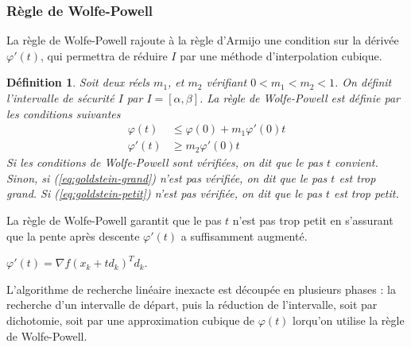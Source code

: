 \documentclass[3p, twocolumn]{elsarticle}
\newtheorem{definition}{Définition}[section]
\begin{document}
\subsubsection{Règle de Wolfe-Powell}
La règle de Wolfe-Powell rajoute à la règle d'Armijo une condition sur la dérivée $\varphi'(t)$, qui permettra de réduire $I$ par une méthode d'interpolation cubique.
\begin{definition}
    Soit deux réels $m_1$, et $m_2$ vérifiant $0<m_1<m_2<1$. On définit l'intervalle de sécurité $I$ par $I=[\alpha,\beta]$. La règle de Wolfe-Powell est définie par les conditions suivantes
    \begin{align}
        \varphi(t)  & \leq \varphi(0) + m_1\varphi'(0)t
        \label{eq:wolfe-powell-grand}                   \\
        \varphi'(t) & \geq m_2\varphi'(0)t
        \label{eq:wolfe-powell-petit}
    \end{align}
    Si les conditions de Wolfe-Powell sont vérifiées, on dit que le pas $t$ convient. Sinon, si (\ref{eq:goldstein-grand}) n'est pas vérifiée, on dit que le pas $t$ est trop grand. Si (\ref{eq:goldstein-petit}) n'est pas vérifiée, on dit que le pas $t$ est trop petit.
\end{definition}
La règle de Wolfe-Powell garantit que le pas $t$ n'est pas trop petit en s'assurant que la pente après descente $\varphi'(t)$ a suffisamment augmenté.
\begin{rmk}
    $\varphi'(t) = \nabla f(x_k+td_k)^Td_k$.
\end{rmk}
L'algorithme de recherche linéaire inexacte est découpée en plusieurs phases : la recherche d'un intervalle de départ, puis la réduction de l'intervalle, soit par dichotomie, soit par une approximation cubique de $\varphi(t)$ lorqu'on utilise la règle de Wolfe-Powell.
\end{document}
